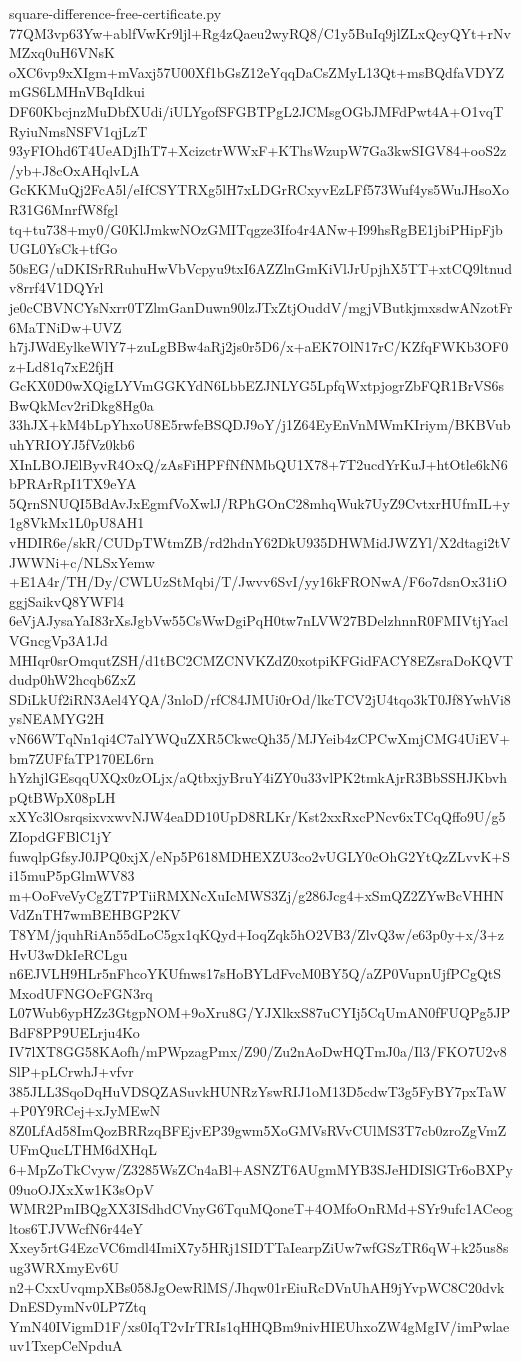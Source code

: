 \documentclass[11pt]{article}
\theoremstyle{definition}
\theoremstyle{remark}
\begin{document}
\begin{filecontents*}[overwrite]{square-difference-free-certificate.py}
77QM3vp63Yw+ablfVwKr9ljl+Rg4zQaeu2wyRQ8/C1y5BuIq9jlZLxQcyQYt+rNvMZxq0uH6VNsK
oXC6vp9xXIgm+mVaxj57U00Xf1bGsZ12eYqqDaCsZMyL13Qt+msBQdfaVDYZmGS6LMHnVBqIdkui
DF60KbcjnzMuDbfXUdi/iULYgofSFGBTPgL2JCMsgOGbJMFdPwt4A+O1vqTRyiuNmsNSFV1qjLzT
93yFIOhd6T4UeADjIhT7+XcizctrWWxF+KThsWzupW7Ga3kwSIGV84+ooS2z/yb+J8cOxAHqlvLA
GcKKMuQj2FcA5l/eIfCSYTRXg5lH7xLDGrRCxyvEzLFf573Wuf4ys5WuJHsoXoR31G6MnrfW8fgl
tq+tu738+my0/G0KlJmkwNOzGMITqgze3Ifo4r4ANw+I99hsRgBE1jbiPHipFjbUGL0YsCk+tfGo
50sEG/uDKISrRRuhuHwVbVcpyu9txI6AZZlnGmKiVlJrUpjhX5TT+xtCQ9ltnudv8rrf4V1DQYrl
je0cCBVNCYsNxrr0TZlmGanDuwn90lzJTxZtjOuddV/mgjVButkjmxsdwANzotFr6MaTNiDw+UVZ
h7jJWdEylkeWlY7+zuLgBBw4aRj2js0r5D6/x+aEK7OlN17rC/KZfqFWKb3OF0z+Ld81q7xE2fjH
GcKX0D0wXQigLYVmGGKYdN6LbbEZJNLYG5LpfqWxtpjogrZbFQR1BrVS6sBwQkMcv2riDkg8Hg0a
33hJX+kM4bLpYhxoU8E5rwfeBSQDJ9oY/j1Z64EyEnVnMWmKIriym/BKBVubuhYRIOYJ5fVz0kb6
XInLBOJElByvR4OxQ/zAsFiHPFfNfNMbQU1X78+7T2ucdYrKuJ+htOtle6kN6bPRArRpI1TX9eYA
5QrnSNUQI5BdAvJxEgmfVoXwlJ/RPhGOnC28mhqWuk7UyZ9CvtxrHUfmIL+y1g8VkMx1L0pU8AH1
vHDIR6e/skR/CUDpTWtmZB/rd2hdnY62DkU935DHWMidJWZYl/X2dtagi2tVJWWNi+c/NLSxYemw
+E1A4r/TH/Dy/CWLUzStMqbi/T/Jwvv6SvI/yy16kFRONwA/F6o7dsnOx31iOggjSaikvQ8YWFl4
6eVjAJysaYaI83rXsJgbVw55CsWwDgiPqH0tw7nLVW27BDelzhnnR0FMIVtjYaclVGncgVp3A1Jd
MHIqr0srOmqutZSH/d1tBC2CMZCNVKZdZ0xotpiKFGidFACY8EZsraDoKQVTdudp0hW2hcqb6ZxZ
SDiLkUf2iRN3Ael4YQA/3nloD/rfC84JMUi0rOd/lkcTCV2jU4tqo3kT0Jf8YwhVi8ysNEAMYG2H
vN66WTqNn1qi4C7alYWQuZXR5CkwcQh35/MJYeib4zCPCwXmjCMG4UiEV+bm7ZUFfaTP170EL6rn
hYzhjlGEsqqUXQx0zOLjx/aQtbxjyBruY4iZY0u33vlPK2tmkAjrR3BbSSHJKbvhpQtBWpX08pLH
xXYc3lOsrqsixvxwvNJW4eaDD10UpD8RLKr/Kst2xxRxcPNcv6xTCqQffo9U/g5ZIopdGFBlC1jY
fuwqlpGfsyJ0JPQ0xjX/eNp5P618MDHEXZU3co2vUGLY0cOhG2YtQzZLvvK+Si15muP5pGlmWV83
m+OoFveVyCgZT7PTiiRMXNcXuIcMWS3Zj/g286Jcg4+xSmQZ2ZYwBcVHHNVdZnTH7wmBEHBGP2KV
T8YM/jquhRiAn55dLoC5gx1qKQyd+IoqZqk5hO2VB3/ZlvQ3w/e63p0y+x/3+zHvU3wDkIeRCLgu
n6EJVLH9HLr5nFhcoYKUfnws17sHoBYLdFvcM0BY5Q/aZP0VupnUjfPCgQtSMxodUFNGOcFGN3rq
L07Wub6ypHZz3GtgpNOM+9oXru8G/YJXlkxS87uCYIj5CqUmAN0fFUQPg5JPBdF8PP9UELrju4Ko
IV7lXT8GG58KAofh/mPWpzagPmx/Z90/Zu2nAoDwHQTmJ0a/Il3/FKO7U2v8SlP+pLCrwhJ+vfvr
385JLL3SqoDqHuVDSQZASuvkHUNRzYswRIJ1oM13D5cdwT3g5FyBY7pxTaW+P0Y9RCej+xJyMEwN
8Z0LfAd58ImQozBRRzqBFEjvEP39gwm5XoGMVsRVvCUlMS3T7cb0zroZgVmZUFmQucLTHM6dXHqL
6+MpZoTkCvyw/Z3285WsZCn4aBl+ASNZT6AUgmMYB3SJeHDISlGTr6oBXPy09uoOJXxXw1K3sOpV
WMR2PmIBQgXX3ISdhdCVnyG6TquMQoneT+4OMfoOnRMd+SYr9ufc1ACeogltos6TJVWcfN6r44eY
Xxey5rtG4EzcVC6mdl4ImiX7y5HRj1SIDTTaIearpZiUw7wfGSzTR6qW+k25us8sug3WRXmyEv6U
n2+CxxUvqmpXBs058JgOewRlMS/Jhqw01rEiuRcDVnUhAH9jYvpWC8C20dvkDnESDymNv0LP7Ztq
YmN40IVigmD1F/xs0IqT2vIrTRIs1qHHQBm9nivHIEUhxoZW4gMgIV/imPwlaeuv1TxepCeNpduA

\end{filecontents*}
\end{document}
